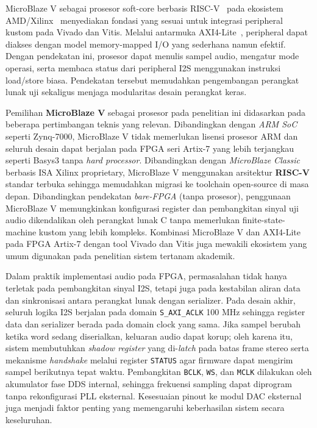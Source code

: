 \hspace{1cm}MicroBlaze V sebagai prosesor soft-core berbasis RISC-V~\citep{waterman_riscv_2016} pada ekosistem AMD/Xilinx~\citep{xilinx_microblaze_ref_2021} menyediakan fondasi yang sesuai untuk integrasi peripheral kustom pada Vivado dan Vitis. Melalui antarmuka AXI4-Lite~\citep{arm_amba_axi_2010}, peripheral dapat diakses dengan model memory-mapped I/O yang sederhana namun efektif. Dengan pendekatan ini, prosesor dapat menulis sampel audio, mengatur mode operasi, serta membaca status dari peripheral I2S menggunakan instruksi load/store biasa. Pendekatan tersebut memudahkan pengembangan perangkat lunak uji sekaligus menjaga modularitas desain perangkat keras.

\hspace{1cm}Pemilihan \textbf{MicroBlaze V} sebagai prosesor pada penelitian ini didasarkan pada beberapa pertimbangan teknis yang relevan. Dibandingkan dengan \textit{ARM SoC} seperti Zynq-7000, MicroBlaze V tidak memerlukan lisensi prosesor ARM dan seluruh desain dapat berjalan pada FPGA seri Artix-7 yang lebih terjangkau seperti Basys3 tanpa \textit{hard processor}. Dibandingkan dengan \textit{MicroBlaze Classic} berbasis ISA Xilinx proprietary, MicroBlaze V menggunakan arsitektur \textbf{RISC-V} standar terbuka sehingga memudahkan migrasi ke toolchain open-source di masa depan. Dibandingkan pendekatan \textit{bare-FPGA} (tanpa prosesor), penggunaan MicroBlaze V memungkinkan konfigurasi register dan pembangkitan sinyal uji audio dikendalikan oleh perangkat lunak C tanpa memerlukan finite-state-machine kustom yang lebih kompleks. Kombinasi MicroBlaze V dan AXI4-Lite pada FPGA Artix-7 dengan tool Vivado dan Vitis juga mewakili ekosistem yang umum digunakan pada penelitian sistem tertanam akademik.

\hspace{1cm}Dalam praktik implementasi audio pada FPGA, permasalahan tidak hanya terletak pada pembangkitan sinyal I2S, tetapi juga pada kestabilan aliran data dan sinkronisasi antara perangkat lunak dengan serializer. Pada desain akhir, seluruh logika I2S berjalan pada domain \texttt{S\_AXI\_ACLK} 100 MHz sehingga register data dan serializer berada pada domain clock yang sama. Jika sampel berubah ketika word sedang diserialkan, keluaran audio dapat korup; oleh karena itu, sistem membutuhkan \textit{shadow register} yang di-\textit{latch} pada batas frame stereo serta mekanisme \textit{handshake} melalui register \texttt{STATUS} agar firmware dapat mengirim sampel berikutnya tepat waktu. Pembangkitan \texttt{BCLK}, \texttt{WS}, dan \texttt{MCLK} dilakukan oleh akumulator fase DDS internal, sehingga frekuensi sampling dapat diprogram tanpa rekonfigurasi PLL eksternal. Kesesuaian pinout ke modul DAC eksternal~\citep{pcm5102a_datasheet} juga menjadi faktor penting yang memengaruhi keberhasilan sistem secara keseluruhan.

